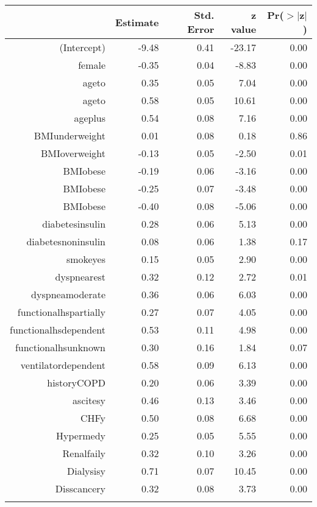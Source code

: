 \bigskip\bigskip
\centering
\begin{tabular}{rrrrr}
  \hline
 & Estimate & Std. Error & z value & Pr($>$$|$z$|$) \\ 
  \hline
(Intercept) & -9.48 & 0.41 & -23.17 & 0.00 \\ 
  female & -0.35 & 0.04 & -8.83 & 0.00 \\ 
  age\-65\-to\-74 & 0.35 & 0.05 & 7.04 & 0.00 \\ 
  age\-75\-to\-84 & 0.58 & 0.05 & 10.61 & 0.00 \\ 
  age\-85\-plus & 0.54 & 0.08 & 7.16 & 0.00 \\ 
  BMI\-underweight & 0.01 & 0.08 & 0.18 & 0.86 \\ 
  BMI\-overweight & -0.13 & 0.05 & -2.50 & 0.01 \\ 
  BMI\-obese\-1 & -0.19 & 0.06 & -3.16 & 0.00 \\ 
  BMI\-obese\-2 & -0.25 & 0.07 & -3.48 & 0.00 \\ 
  BMI\-obese\-3 & -0.40 & 0.08 & -5.06 & 0.00 \\ 
  diabetes\-insulin & 0.28 & 0.06 & 5.13 & 0.00 \\ 
  diabetes\-noninsulin & 0.08 & 0.06 & 1.38 & 0.17 \\ 
  smoke\-yes & 0.15 & 0.05 & 2.90 & 0.00 \\ 
  dyspnea\-rest & 0.32 & 0.12 & 2.72 & 0.01 \\ 
  dyspnea\-moderate & 0.36 & 0.06 & 6.03 & 0.00 \\ 
  functional\-hs\-partially & 0.27 & 0.07 & 4.05 & 0.00 \\ 
  functional\-hs\-dependent & 0.53 & 0.11 & 4.98 & 0.00 \\ 
  functional\-hs\-unknown & 0.30 & 0.16 & 1.84 & 0.07 \\ 
  ventilator\-dependent & 0.58 & 0.09 & 6.13 & 0.00 \\ 
  history\-COPD & 0.20 & 0.06 & 3.39 & 0.00 \\ 
  ascites\-y & 0.46 & 0.13 & 3.46 & 0.00 \\ 
  CHF\-y & 0.50 & 0.08 & 6.68 & 0.00 \\ 
  Hyper\-med\-y & 0.25 & 0.05 & 5.55 & 0.00 \\ 
  Renal\-fail\-y & 0.32 & 0.10 & 3.26 & 0.00 \\ 
  Dialysis\-y & 0.71 & 0.07 & 10.45 & 0.00 \\ 
  Diss\-cancer\-y & 0.32 & 0.08 & 3.73 & 0.00 \\ 
$$
\end{tabular}
